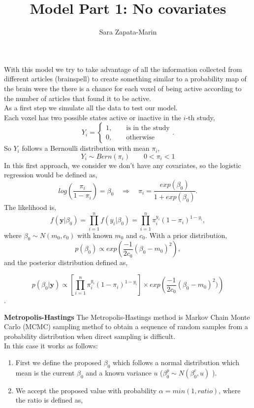 \documentclass[10pt]{article}
\title{Model Part 1: No covariates}
\author{Sara Zapata-Marin}
\begin{document}
\maketitle

With this model we try to take advantage of all the information collected from different articles (brainspell) to create something similar to a probability map of the brain were the there is a chance for each voxel of being active according to the number of articles that found it to be active.
\\ As a first step we simulate all the data to test our model.
\\
Each voxel has two possible states active or inactive in the $i$-th study,
\[ Y_i= 
\begin{cases}
1,\qquad \text{is in the study}\\
0, \qquad \text{otherwise}
\end{cases}.
\]
So $Y_i$ follows a Bernoulli distribution with mean $\pi_i$,
\[Y_i \sim Bern(\pi_i) \qquad 0<\pi_i <1\]
In this first approach, we consider we don't have any covariates, so the logistic regression would be defined as,
\[ log \left(\dfrac{\pi_i}{1-\pi_i} \right)=\beta_0 \quad \Rightarrow  \quad \pi_i = \dfrac{exp(\beta_0)}{1+ exp(\beta_0)}. \]
The likelihood is,
\[ f(\textbf{y}| \beta_0)= \prod_{i=1}^{n} f(y_i| \beta_0)=\prod_{i=1}^{n} \pi_i^{y_i}(1-\pi_i)^{1-y_i},\]
where $ \beta_0 \sim N(m_0,c_0) $ with known $m_0$ and $c_0$.
With a prior distribution,
\[
p(\beta_0)\propto exp\left( \dfrac{-1}{2c_0}(\beta_0-m_0)^2 \right),
\]
and the posterior distribution defined as,

\[p(\beta_0|\textbf{y})\propto \left[ \prod_{i=1}^{n} \pi_i^{y_i}(1-\pi_i)^{1-y_i} \right] \times exp\left( \dfrac{-1}{2 c_0}(\beta_0-m_0)^2)\right)\] .

\textbf{Metropolis-Hastings}
The Metropolis-Hastings method is Markov Chain Monte Carlo (MCMC) sampling methof to obtain a sequence of random samples from a probability distribution when direct sampling is difficult.
\\ In this case it works as follows:

\begin{enumerate}
\item First we define the proposed $\beta_0$ which follows a normal distribution which mean is the current $\beta_0$ and a known variance $u$ ($\beta_0^p \sim N(\beta_0^c,u)$ ).
\item We accept the proposed value with probability $\alpha = min(1, ratio)$, where the ratio is defined as,
\end{enumerate}
\end{document}
